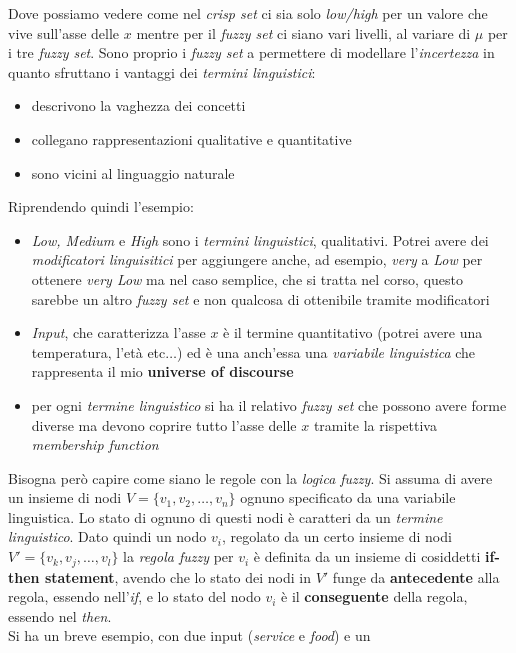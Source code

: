 \documentclass[a4paper,12pt, oneside]{book}
\begin{document}
Dove possiamo vedere come nel \textit{crisp set} ci sia solo \textit{low/high}
per un valore che vive sull'asse delle $x$ mentre per il \textit{fuzzy set} ci
siano vari livelli, al variare di $\mu$ per i tre \textit{fuzzy set}. Sono
proprio i \textit{fuzzy set} a permettere di modellare l'\textit{incertezza} in
quanto sfruttano i vantaggi dei \textit{termini linguistici}:
\begin{itemize}
  \item descrivono la vaghezza dei concetti
  \item collegano rappresentazioni qualitative e quantitative
  \item sono vicini al linguaggio naturale
\end{itemize}
Riprendendo quindi l'esempio:
\begin{itemize}
  \item \textit{Low, Medium} e \textit{High} sono i \textit{termini
    linguistici}, qualitativi. Potrei avere dei \textit{modificatori
    linguisitici} per aggiungere anche, ad esempio, \textit{very} a \textit{Low}
  per ottenere \textit{very Low} ma nel caso semplice, che si tratta nel corso,
  questo sarebbe un altro 
  \textit{fuzzy set} e non qualcosa di ottenibile tramite modificatori 
  \item \textit{Input}, che caratterizza l'asse $x$ è il termine quantitativo
  (potrei avere una temperatura, l'età etc$\ldots$) ed è una anch'essa una
  \textit{variabile 
    linguistica} che rappresenta il mio \textbf{universe of discourse}
  \item per ogni \textit{termine linguistico} si ha il relativo \textit{fuzzy
    set} che possono avere forme diverse ma devono coprire tutto l'asse delle
  $x$ tramite la rispettiva \textit{membership function}
\end{itemize}
Bisogna però capire come siano le regole con la \textit{logica fuzzy}. Si assuma
di avere un insieme di nodi $V=\{v_1,v_2,\ldots,v_n\}$ ognuno specificato da
una variabile linguistica. Lo stato di ognuno di questi nodi è
caratteri da un \textit{termine linguistico}. Dato quindi un nodo $v_i$,
regolato da un certo insieme di nodi $V'=\{v_k, v_j, \ldots, v_l\}$ la
\textit{regola fuzzy} per $v_i$ è definita da un insieme di cosiddetti
\textbf{if-then statement}, avendo che lo stato dei nodi in $V'$ funge da
\textbf{antecedente} alla regola, essendo nell'\textit{if}, e lo stato del nodo
$v_i$ è il \textbf{conseguente} della regola, essendo nel \textit{then}.\\
Si ha un breve esempio, con due input (\textit{service} e \textit{food}) e un
\end{document}
